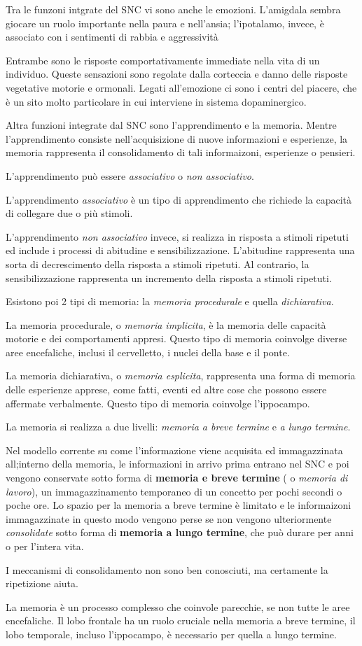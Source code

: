 \documentclass[]{article}
\begin{document}
Tra le funzoni intgrate del SNC vi sono anche le emozioni. L'amigdala
sembra giocare un ruolo importante nella paura e nell'ansia;
l'ipotalamo, invece, è associato con i sentimenti di rabbia e
aggressività

Entrambe sono le risposte comportativamente immediate nella vita di un
individuo. Queste sensazioni sono regolate dalla corteccia e danno delle
risposte vegetative motorie e ormonali. Legati all'emozione ci sono i
centri del piacere, che è un sito molto particolare in cui interviene in
sistema dopaminergico.

Altra funzioni integrate dal SNC sono l'apprendimento e la memoria.
Mentre l'apprendimento consiste nell'acquisizione di nuove informazioni
e esperienze, la memoria rappresenta il consolidamento di tali
informaizoni, esperienze o pensieri.

L'apprendimento può essere \emph{associativo} o \emph{non associativo}.

L'apprendimento \emph{associativo} è un tipo di apprendimento che
richiede la capacità di collegare due o più stimoli.

L'apprendimento \emph{non associativo} invece, si realizza in risposta a
stimoli ripetuti ed include i processi di abitudine e sensibilizzazione.
L'abitudine rappresenta una sorta di decrescimento della risposta a
stimoli ripetuti. Al contrario, la sensibilizzazione rappresenta un
incremento della risposta a stimoli ripetuti.

Esistono poi 2 tipi di memoria: la \emph{memoria procedurale} e quella
\emph{dichiarativa}.

La memoria procedurale, o \emph{memoria implicita}, è la memoria delle
capacità motorie e dei comportamenti appresi. Questo tipo di memoria
coinvolge diverse aree encefaliche, inclusi il cervelletto, i nuclei
della base e il ponte.

La memoria dichiarativa, o \emph{memoria esplicita}, rappresenta una
forma di memoria delle esperienze apprese, come fatti, eventi ed altre
cose che possono essere affermate verbalmente. Questo tipo di memoria
coinvolge l'ippocampo.

La memoria si realizza a due livelli: \emph{memoria a breve termine} e
\emph{a lungo termine}.

Nel modello corrente su come l'informazione viene acquisita ed
immagazzinata all;interno della memoria, le informazioni in arrivo prima
entrano nel SNC e poi vengono conservate sotto forma di \textbf{memoria
e breve termine} ( o \emph{memoria di lavoro}), un immagazzinamento
temporaneo di un concetto per pochi secondi o poche ore. Lo spazio per
la memoria a breve termine è limitato e le informaizoni immagazzinate in
questo modo vengono perse se non vengono ulteriormente
\emph{consolidate} sotto forma di \textbf{memoria a lungo termine}, che
può durare per anni o per l'intera vita.

I meccanismi di consolidamento non sono ben conosciuti, ma certamente la
ripetizione aiuta.

La memoria è un processo complesso che coinvole parecchie, se non tutte
le aree encefaliche. Il lobo frontale ha un ruolo cruciale nella memoria
a breve termine, il lobo temporale, incluso l'ippocampo, è necessario
per quella a lungo termine.
\end{document}
